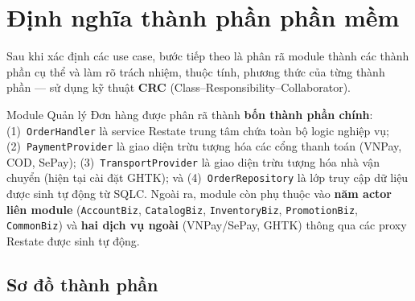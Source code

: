 
\section{Định nghĩa thành phần phần mềm}
\label{sec:components}

Sau khi xác định các use case, bước tiếp theo là phân rã module thành các thành phần cụ thể
và làm rõ trách nhiệm, thuộc tính, phương thức của từng thành phần --- sử dụng kỹ thuật
\textbf{CRC} (Class--Responsibility--Collaborator).

Module Quản lý Đơn hàng được phân rã thành \textbf{bốn thành phần chính}: (1)~\texttt{OrderHandler}
là service Restate trung tâm chứa toàn bộ logic nghiệp vụ; (2)~\texttt{PaymentProvider} là giao
diện trừu tượng hóa các cổng thanh toán (VNPay, COD, SePay); (3)~\texttt{TransportProvider} là
giao diện trừu tượng hóa nhà vận chuyển (hiện tại cài đặt GHTK); và (4)~\texttt{OrderRepository} là lớp truy cập
dữ liệu được sinh tự động từ SQLC. Ngoài ra, module còn phụ thuộc vào \textbf{năm actor liên
module} (\texttt{AccountBiz}, \texttt{CatalogBiz}, \texttt{InventoryBiz}, \texttt{PromotionBiz},
\texttt{CommonBiz}) và \textbf{hai dịch vụ ngoài} (VNPay/SePay, GHTK) thông qua các proxy Restate
được sinh tự động.

\subsection{Sơ đồ thành phần}
\label{subsec:component-diagram}

